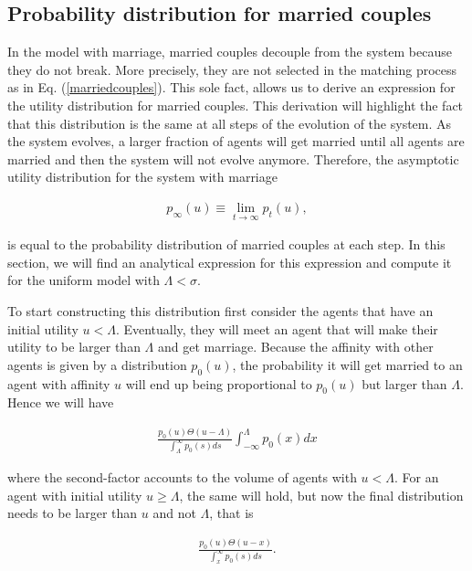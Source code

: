 \documentclass[12pt]{article}
\begin{document}
\subsection{Probability distribution for married couples}
\label{marriedcouplesdistribution}

In the model with marriage, married couples decouple from the system because they do not break. More precisely, they are not selected in the matching process as in Eq. (\ref{marriedcouples}). This sole fact, allows us to derive an expression for the utility distribution for married couples. This derivation will highlight the fact that this distribution is the same at all steps of the evolution of the system. As the system evolves, a larger fraction of agents will get married until all agents are married and then the system will not evolve anymore. Therefore, the asymptotic utility distribution for the system with marriage 

\begin{align}
    p_\infty(u)\equiv\lim_{t\rightarrow\infty}p_t(u),
\end{align}

\noindent is equal to the probability distribution of married couples at each step. In this section, we will find an analytical expression for this expression and compute it for the uniform model with $\Lambda<\sigma$.

To start constructing this distribution first consider the agents that have an initial utility $u<\Lambda$. Eventually, they will meet an agent that will make their utility to be larger than $\Lambda$ and get marriage. Because the affinity with other agents is given by a distribution $p_0(u)$, the probability it will get married to an agent with affinity $u$ will end up being proportional to $p_0(u)$ but larger than $\Lambda$. Hence we will have

\begin{align}
    \frac{p_0(u)\Theta(u-\Lambda)}{\int_\Lambda^\infty p_0(s)ds}\int_{-\infty}^\Lambda p_0(x)dx
\end{align}

\noindent where the second-factor accounts to the volume of agents with $u<\Lambda$. For an agent with initial utility $u\geq\Lambda$, the same will hold, but now the final distribution needs to be larger than $u$ and not $\Lambda$, that is

\begin{align}
    \frac{p_0(u)\Theta(u-x)}{\int_x^\infty p_0(s)ds}.
\end{align}
\end{document}
